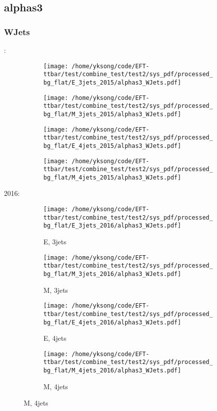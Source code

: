 \documentclass{beamer}
\begin{document}
\subsection{alphas3}

\begin{frame}
\frametitle{WJets}
\fontsize{5}{1}:
\begin{figure}
\centering
\begin{subfigure}[b]{0.24\textwidth}
\texttt{[image: /home/yksong/code/EFT-ttbar/test/combine\_test/test2/sys\_pdf/processed\_bg\_flat/E\_3jets\_2015/alphas3\_WJets.pdf]}
\end{subfigure}
\begin{subfigure}[b]{0.24\textwidth}
\texttt{[image: /home/yksong/code/EFT-ttbar/test/combine\_test/test2/sys\_pdf/processed\_bg\_flat/M\_3jets\_2015/alphas3\_WJets.pdf]}
\end{subfigure}
\begin{subfigure}[b]{0.24\textwidth}
\texttt{[image: /home/yksong/code/EFT-ttbar/test/combine\_test/test2/sys\_pdf/processed\_bg\_flat/E\_4jets\_2015/alphas3\_WJets.pdf]}
\end{subfigure}
\begin{subfigure}[b]{0.24\textwidth}
\texttt{[image: /home/yksong/code/EFT-ttbar/test/combine\_test/test2/sys\_pdf/processed\_bg\_flat/M\_4jets\_2015/alphas3\_WJets.pdf]}
\end{subfigure}
\end{figure}
2016:
\begin{figure}
\centering
\begin{subfigure}[b]{0.24\textwidth}
\texttt{[image: /home/yksong/code/EFT-ttbar/test/combine\_test/test2/sys\_pdf/processed\_bg\_flat/E\_3jets\_2016/alphas3\_WJets.pdf]}
\captionsetup{font=tiny}
\caption{E, 3jets}
\end{subfigure}
\begin{subfigure}[b]{0.24\textwidth}
\texttt{[image: /home/yksong/code/EFT-ttbar/test/combine\_test/test2/sys\_pdf/processed\_bg\_flat/M\_3jets\_2016/alphas3\_WJets.pdf]}
\captionsetup{font=tiny}
\caption{M, 3jets}
\end{subfigure}
\begin{subfigure}[b]{0.24\textwidth}
\texttt{[image: /home/yksong/code/EFT-ttbar/test/combine\_test/test2/sys\_pdf/processed\_bg\_flat/E\_4jets\_2016/alphas3\_WJets.pdf]}
\captionsetup{font=tiny}
\caption{E, 4jets}
\end{subfigure}
\begin{subfigure}[b]{0.24\textwidth}
\texttt{[image: /home/yksong/code/EFT-ttbar/test/combine\_test/test2/sys\_pdf/processed\_bg\_flat/M\_4jets\_2016/alphas3\_WJets.pdf]}
\captionsetup{font=tiny}
\caption{M, 4jets}
\end{subfigure}
\end{figure}
\end{frame}
\end{document}
